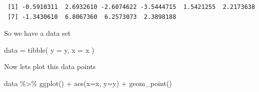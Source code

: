 \documentclass[
  letterpaper,
  DIV=11,
  numbers=noendperiod]{scrreprt}
\newenvironment{Shaded}{\begin{snugshade}}{\end{snugshade}}
\newcommand{\AttributeTok}[1]{\textcolor[rgb]{0.65,0.35,0.00}{#1}}
\newcommand{\FunctionTok}[1]{\textcolor[rgb]{0.02,0.16,0.49}{#1}}
\newcommand{\NormalTok}[1]{\textcolor[rgb]{0.33,0.33,0.33}{#1}}
\newcommand{\OtherTok}[1]{\textcolor[rgb]{0.85,0.12,0.09}{#1}}
\newcommand{\SpecialCharTok}[1]{\textcolor[rgb]{0.00,0.46,0.62}{#1}}
\begin{document}
\begin{verbatim}
 [1] -0.5910311  2.6932610 -2.6074622 -3.5444715  1.5421255  2.2173638
 [7] -1.3430610  6.8067360  6.2573073  2.3898188
\end{verbatim}

So we have a data set

\begin{Shaded}
\begin{Highlighting}[]
\NormalTok{data }\OtherTok{=} \FunctionTok{tibble}\NormalTok{(}
  \AttributeTok{y =}\NormalTok{ y, }\AttributeTok{x =}\NormalTok{ x}
\NormalTok{)}
\end{Highlighting}
\end{Shaded}

Now lets plot this data points

\begin{Shaded}
\begin{Highlighting}[]
\NormalTok{data }\SpecialCharTok{\%\textgreater{}\%} 
  \FunctionTok{ggplot}\NormalTok{() }\SpecialCharTok{+} \FunctionTok{aes}\NormalTok{(}\AttributeTok{x=}\NormalTok{x, }\AttributeTok{y=}\NormalTok{y) }\SpecialCharTok{+} \FunctionTok{geom\_point}\NormalTok{() }
\end{Highlighting}
\end{Shaded}
\end{document}
